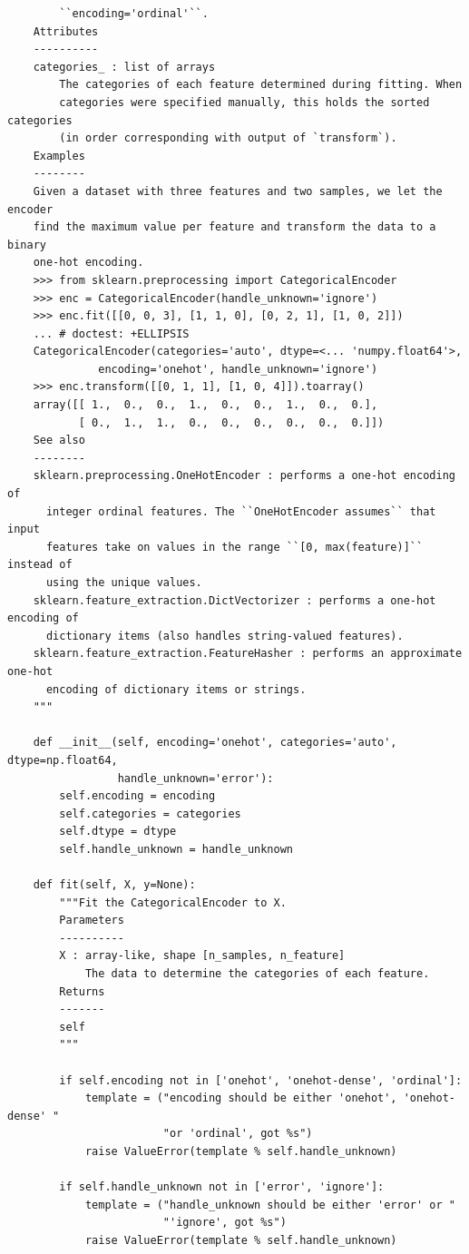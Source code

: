 \documentclass[UTF8]{ctexart}
\begin{document}
\begin{lstlisting}
        ``encoding='ordinal'``.
    Attributes
    ----------
    categories_ : list of arrays
        The categories of each feature determined during fitting. When
        categories were specified manually, this holds the sorted categories
        (in order corresponding with output of `transform`).
    Examples
    --------
    Given a dataset with three features and two samples, we let the encoder
    find the maximum value per feature and transform the data to a binary
    one-hot encoding.
    >>> from sklearn.preprocessing import CategoricalEncoder
    >>> enc = CategoricalEncoder(handle_unknown='ignore')
    >>> enc.fit([[0, 0, 3], [1, 1, 0], [0, 2, 1], [1, 0, 2]])
    ... # doctest: +ELLIPSIS
    CategoricalEncoder(categories='auto', dtype=<... 'numpy.float64'>,
              encoding='onehot', handle_unknown='ignore')
    >>> enc.transform([[0, 1, 1], [1, 0, 4]]).toarray()
    array([[ 1.,  0.,  0.,  1.,  0.,  0.,  1.,  0.,  0.],
           [ 0.,  1.,  1.,  0.,  0.,  0.,  0.,  0.,  0.]])
    See also
    --------
    sklearn.preprocessing.OneHotEncoder : performs a one-hot encoding of
      integer ordinal features. The ``OneHotEncoder assumes`` that input
      features take on values in the range ``[0, max(feature)]`` instead of
      using the unique values.
    sklearn.feature_extraction.DictVectorizer : performs a one-hot encoding of
      dictionary items (also handles string-valued features).
    sklearn.feature_extraction.FeatureHasher : performs an approximate one-hot
      encoding of dictionary items or strings.
    """

    def __init__(self, encoding='onehot', categories='auto', dtype=np.float64,
                 handle_unknown='error'):
        self.encoding = encoding
        self.categories = categories
        self.dtype = dtype
        self.handle_unknown = handle_unknown

    def fit(self, X, y=None):
        """Fit the CategoricalEncoder to X.
        Parameters
        ----------
        X : array-like, shape [n_samples, n_feature]
            The data to determine the categories of each feature.
        Returns
        -------
        self
        """

        if self.encoding not in ['onehot', 'onehot-dense', 'ordinal']:
            template = ("encoding should be either 'onehot', 'onehot-dense' "
                        "or 'ordinal', got %s")
            raise ValueError(template % self.handle_unknown)

        if self.handle_unknown not in ['error', 'ignore']:
            template = ("handle_unknown should be either 'error' or "
                        "'ignore', got %s")
            raise ValueError(template % self.handle_unknown)


\end{lstlisting}
\end{document}
